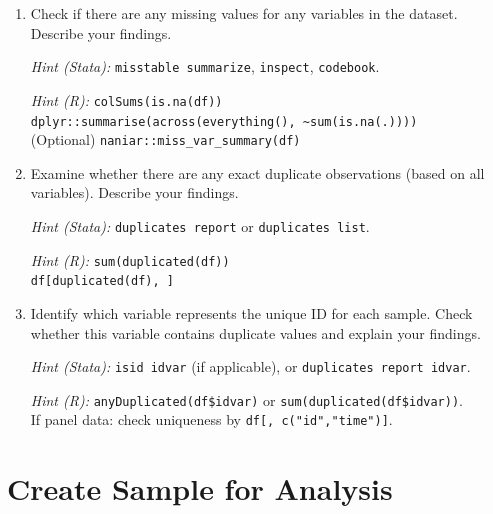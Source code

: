 \documentclass[paper=a4, fontsize=11pt]{scrartcl} %
\begin{document}
\begin{enumerate}
\item Check if there are any missing values for any variables in the dataset. Describe your findings.

\textit{Hint (Stata):} \texttt{misstable summarize}, \texttt{inspect}, \texttt{codebook}.

\textit{Hint (R):} \texttt{colSums(is.na(df))} \\
\texttt{dplyr::summarise(across(everything(), \textasciitilde sum(is.na(.))))} \\
(Optional) \texttt{naniar::miss\_var\_summary(df)}

\item Examine whether there are any exact duplicate observations (based on all variables). Describe your findings.

\textit{Hint (Stata):} \texttt{duplicates report} or \texttt{duplicates list}.

\textit{Hint (R):} \texttt{sum(duplicated(df))} \\
\texttt{df[duplicated(df), ]}

\item Identify which variable represents the unique ID for each sample. Check whether this variable contains duplicate values and explain your findings.

\textit{Hint (Stata):} \texttt{isid idvar} (if applicable), or \texttt{duplicates report idvar}.

\textit{Hint (R):} \texttt{anyDuplicated(df\$idvar)} or \texttt{sum(duplicated(df\$idvar))}. \\
If panel data: check uniqueness by \texttt{df[, c("id","time")]}.
\end{enumerate}

\vspace{0.3cm}


\section{Create Sample for Analysis}
\end{document}
